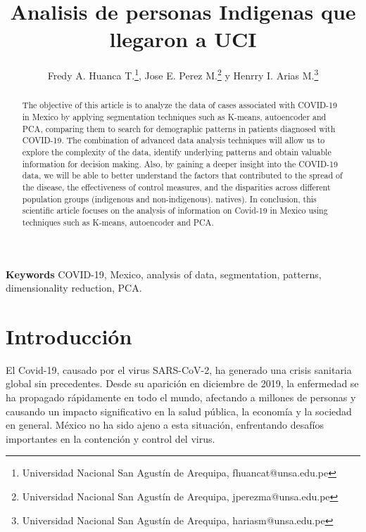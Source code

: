 \documentclass[a4paper,
               ]{jacow}
\newenvironment{keywords}
{\par\small\textbf{Keywords}}
{\par}
\begin{document}
\title{Analisis de personas Indigenas que llegaron a UCI}

\author{Fredy A. Huanca T.\thanks{Universidad Nacional San Agustín de Arequipa, fhuancat@unsa.edu.pe},
		Jose E. Perez M.\thanks{Universidad Nacional San Agustín de Arequipa, jperezma@unsa.edu.pe} y
		Henrry I. Arias M.\thanks{Universidad Nacional San Agustín de Arequipa, hariasm@unsa.edu.pe}}
	
\maketitle

%
\begin{abstract}
The objective of this article is to analyze the data of cases associated with COVID-19 in Mexico by applying segmentation techniques such as K-means, autoencoder and PCA, comparing them to search for demographic patterns in patients diagnosed with COVID-19.
The combination of advanced data analysis techniques will allow us to explore the complexity of the data, identify underlying patterns and obtain valuable information for decision making.
Also, by gaining a deeper insight into the COVID-19 data, we will be able to better understand the factors that contributed to the spread of the disease, the effectiveness of control measures, and the disparities across different population groups (indigenous and non-indigenous). natives).
In conclusion, this scientific article focuses on the analysis of information on Covid-19 in Mexico using techniques such as K-means, autoencoder and PCA.
\end{abstract}

\begin{keywords}
COVID-19, Mexico, analysis of data, segmentation, patterns, dimensionality reduction, PCA.
\end{keywords}

\section{Introducción}

El Covid-19, causado por el virus SARS-CoV-2, ha generado una crisis sanitaria global sin precedentes. Desde su aparición en diciembre de 2019, la enfermedad se ha propagado rápidamente en todo el mundo, afectando a millones de personas y causando un impacto significativo en la salud pública, la economía y la sociedad en general. México no ha sido ajeno a esta situación, enfrentando desafíos importantes en la contención y control del virus.
\end{document}

